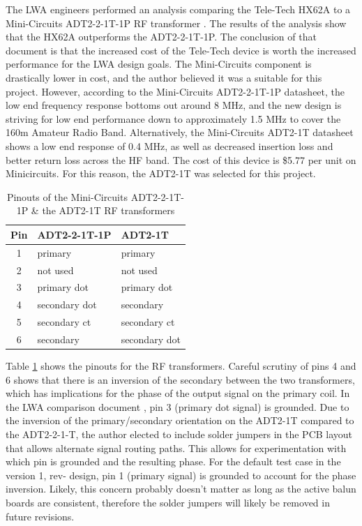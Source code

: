The LWA engineers performed an analysis comparing the Tele-Tech HX62A to a Mini-Circuits ADT2-2-1T-1P RF transformer \cite{lwa_memo_87}.
The results of the analysis show that the HX62A outperforms the ADT2-2-1T-1P.
The conclusion of that document is that the increased cost of the Tele-Tech device is worth the increased performance for the LWA design goals.
The Mini-Circuits component is drastically lower in cost, and the author believed it was a suitable for this project.
However, according to the Mini-Circuits ADT2-2-1T-1P datasheet, the low end frequency response bottoms out around 8 MHz, and the new design is striving for low end performance down to approximately 1.5 MHz to cover the 160m Amateur Radio Band.
Alternatively, the Mini-Circuits ADT2-1T datasheet shows a low end response of 0.4 MHz, as well as decreased insertion loss and better return loss across the HF band.
The cost of this device is \$5.77 per unit on Minicircuits.
For this reason, the ADT2-1T was selected for this project.

\begin{table}[h!]
\begin{center}
\caption{Pinouts of the Mini-Circuits ADT2-2-1T-1P \& the ADT2-1T RF transformers}
\label{table:rf_transformer_pinout}
\begin{tabular}{|c|l|l|}
	\hline
	\textbf{Pin} & \textbf{ADT2-2-1T-1P} & \textbf{ADT2-1T} \\
	\hline
	1 & primary & primary \\
	\hline
	2 & not used & not used \\
	\hline
	3 & primary dot & primary dot \\
	\hline
	4 & secondary dot & secondary \\
	\hline
	5 & secondary ct & secondary ct\\
	\hline
	6 & secondary & secondary dot\\
	\hline
\end{tabular}
\end{center}
\end{table}

Table \ref{table:rf_transformer_pinout} shows the pinouts for the RF transformers.
Careful scrutiny of pins 4 and 6 shows that there is an inversion of the secondary between the two transformers, which has implications for the phase of the output signal on the primary coil.
In the LWA comparison document \cite{lwa_memo_87}, pin 3 (primary dot signal) is grounded.
Due to the inversion of the primary/secondary orientation on the ADT2-1T compared to the ADT2-2-1-T, the author elected to include solder jumpers in the PCB layout that allows alternate signal routing paths.
This allows for experimentation with which pin is grounded and the resulting phase.
For the default test case in the version 1, rev- design, pin 1 (primary signal) is grounded to account for the phase inversion.
Likely, this concern probably doesn't matter as long as the active balun boards are consistent, therefore the solder jumpers will likely be removed in future revisions.

